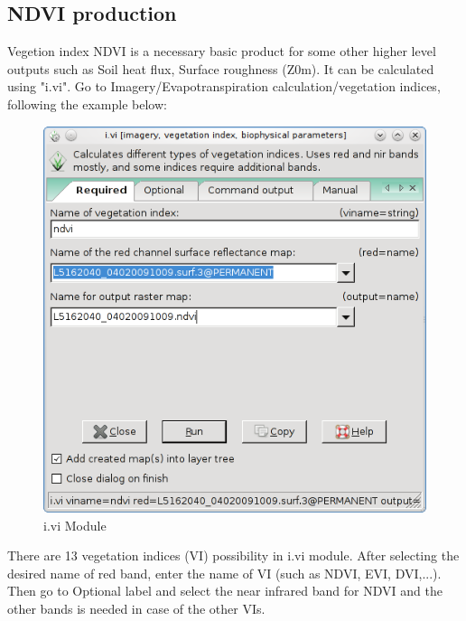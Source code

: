 \subsection{NDVI production}
Vegetion index NDVI is a necessary basic product for some other higher level outputs such as Soil heat flux, Surface roughness (Z0m). It can be  calculated using "i.vi". Go to Imagery/Evapotranspiration calculation/vegetation indices, following the example below:\newline

\begin{figure}[htbp]
   \centering
   \includegraphics[scale=0.4]{gipe018.png}
   \caption{i.vi Module}
   \label{fig:gipe018}
\end{figure}

There are 13 vegetation indices (VI) possibility in i.vi module. After selecting the desired name of red band, enter the name of VI (such as NDVI, EVI, DVI,...). Then go to Optional label and select the near infrared band for NDVI and the other bands is needed in case of the other VIs. \newline

